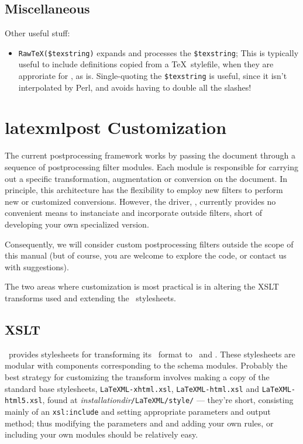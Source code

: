 \documentclass{book}
\newcommand{\ltxcode}{\lstinline[style=latexml]}
\begin{document}
\subsection{Miscellaneous}\label{customization.latexml.misc}
Other useful stuff:
\begin{itemize}
\item \ltxcode|RawTeX($texstring)| expands and processes the \ltxcode|$texstring|;
This is typically useful to include definitions copied from a \TeX\ stylefile,
when they are approriate for \LaTeXML, as is.
Single-quoting the \ltxcode|$texstring| is useful, since it isn't interpolated
by Perl, and avoids having to double all the slashes!
\end{itemize}


\section{latexmlpost Customization}\label{customization.latexmlpost}
The current postprocessing framework works by passing the document through
a sequence of postprocessing filter modules. Each module is responsible
for carrying out a specific transformation, augmentation or conversion
on the document.   In principle, this architecture has the flexibility to
employ new filters to perform new or customized conversions.
However, the driver, , currently provides no
convenient means to instanciate and incorporate outside filters, short
of developing your own specialized version.

Consequently, we will consider custom postprocessing filters outside
the scope of this manual (but of course, you are welcome to explore
the code, or contact us with suggestions).

The two areas where customization is most practical is in altering
the XSLT transforms used and extending the \CSS\ stylesheets.

\subsection{XSLT}\label{customization.latexmlpost.xslt}
\LaTeXML\ provides stylesheets for transforming its \XML\ format
to \XHTML\ and \HTML. These stylesheets are modular with components
corresponding to the schema modules.  Probably the best strategy
for customizing the transform involves making a copy of the standard
base stylesheets, \texttt{LaTeXML-xhtml.xsl},
\texttt{LaTeXML-html.xsl} and
\texttt{LaTeXML-html5.xsl},  found at
\textit{installationdir}\texttt{/LaTeXML/style/}
--- they're short, consisting mainly of an \texttt{xsl:include}
and setting appropriate parameters and output method;
thus modifying the parameters and and adding your own rules,
or including your own modules should be relatively easy.
\end{document}

